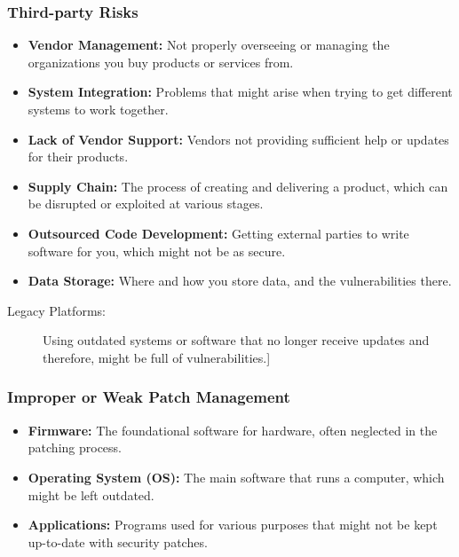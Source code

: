 \begin{fullwidth}
    \subsubsection*{\color{red}Third-party Risks}
    \begin{itemize}
        \item \textbf{Vendor Management:} Not properly overseeing or managing the organizations you buy products or services from.
        \item \textbf{System Integration:} Problems that might arise when trying to get different systems to work together.
        \item \textbf{Lack of Vendor Support:} Vendors not providing sufficient help or updates for their products.
        \item \textbf{Supply Chain:} The process of creating and delivering a product, which can be disrupted or exploited at various stages.
        \item \textbf{Outsourced Code Development:} Getting external parties to write software for you, which might not be as secure.
        \item \textbf{Data Storage:} Where and how you store data, and the vulnerabilities there.
    \end{itemize}

    \begin{description}
        \item[Legacy Platforms:] Using outdated systems or software that no longer receive updates and therefore, might be full of vulnerabilities.] 
    \end{description}

    \subsubsection*{\color{red}Improper or Weak Patch Management}
    \begin{itemize}
        \item \textbf{Firmware:} The foundational software for hardware, often neglected in the patching process.
        \item \textbf{Operating System (OS):} The main software that runs a computer, which might be left outdated.
        \item \textbf{Applications:} Programs used for various purposes that might not be kept up-to-date with security patches.
    \end{itemize}


\end{fullwidth}
